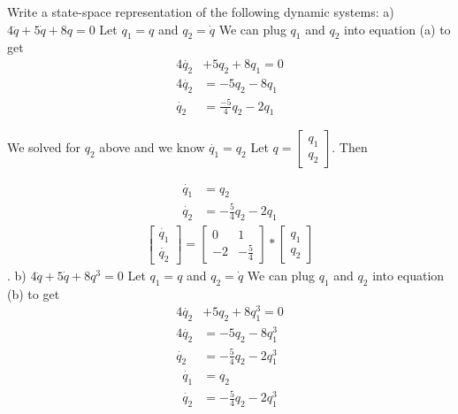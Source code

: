 \documentclass{article}
\begin{document}
  Write a state-space representation of the following dynamic systems:
  \newline
  \newline
  a) $4\ddot{q}+5\dot{q}+8q=0$
  \newline
  \newline
  Let $q_1 = q$ and $q_2 = \dot{q}$
  We can plug $q_1$ and $q_2$ into equation (a) to get
  \begin{align}
    4\dot{q_2} &+ 5q_2 + 8q_1 = 0 \tag{2.1}\\
    4\dot{q_2} &= -5q_2 -8q_1 \tag{2.2} \\
    \dot{q_2}  &= \frac{-5}{4}q_2 - 2q_1 \tag{2.3} 
  \end{align}
  
  \noindent We solved for $q_2$ above and we know $\dot{q_1} = q_2$
  \newline
  Let $q = \begin{bmatrix}
    q_1 \\
    q_2
  \end{bmatrix}$. Then

  \begin{align}
    \dot{q_1} &= q_2 \tag{2.4} \\
    \dot{q_2} &= -\frac{5}{4}q_2 - 2q_1 \tag{2.5}
  \end{align}
  \begin{align}
    \begin{bmatrix}
      \dot{q_1} \\
      \dot{q_2}
    \end{bmatrix} =
    \begin{bmatrix}
      0 & 1 \\
      -2 & -\frac{5}{4}
    \end{bmatrix}*
    \begin{bmatrix}
      q_1 \\
      q_2 \tag{2.6}
    \end{bmatrix}
  \end{align}
  .
  \newline \newline
  \noindent b) $4\ddot{q}+5\dot{q}+8q^3 = 0$
  \newline \newline
  \indent Let $q_1 = q$ and $q_2 = \dot{q}$
  We can plug $q_1$ and $q_2$ into equation (b) to get
  \begin{align*}
    4\dot{q_2} &+ 5q_2 + 8q_1^3 = 0 \tag{2.7} \\
    4\dot{q_2} &= -5q_2 -8q_1^3 \tag{2.8} \\
    \dot{q_2}  &= -\frac{5}{4}q_2 - 2q_1^3 \tag{2.9} 
  \end{align*}
  \begin{align*}
    \dot{q_1} &= q_2 \tag{2.10} \\
    \dot{q_2} &= -\frac{5}{4}q_2 - 2q_1^3 \tag{2.11}
  \end{align*}
     
\end{document}
